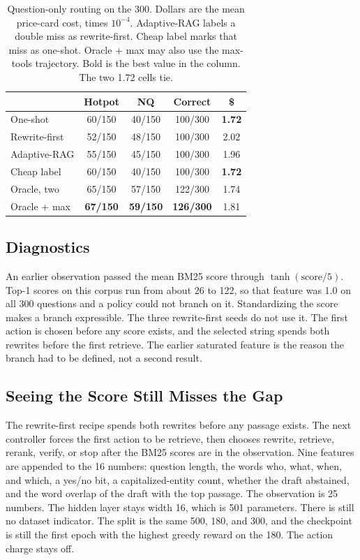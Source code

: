 \documentclass[letterpaper]{article} %
\begin{document}
\begin{table}[t]
\centering
\small
\setlength{\tabcolsep}{3pt}
\begin{tabular}{@{}lcccc@{}}
\toprule
 & Hotpot & NQ & Correct & \$ \\
\midrule
One-shot & 60/150 & 40/150 & 100/300 & \textbf{1.72} \\
Rewrite-first & 52/150 & 48/150 & 100/300 & 2.02 \\
Adaptive-RAG & 55/150 & 45/150 & 100/300 & 1.96 \\
Cheap label & 60/150 & 40/150 & 100/300 & \textbf{1.72} \\
Oracle, two & 65/150 & 57/150 & 122/300 & 1.74 \\
Oracle + max & \textbf{67/150} & \textbf{59/150} & \textbf{126/300} & 1.81 \\
\bottomrule
\end{tabular}
\caption{Question-only routing on the 300. Dollars are the mean price-card cost, times \(10^{-4}\). Adaptive-RAG labels a double miss as rewrite-first. Cheap label marks that miss as one-shot. Oracle + max may also use the max-tools trajectory. Bold is the best value in the column. The two 1.72 cells tie.}
\label{tab:adaptive}
\end{table}

\subsection{Diagnostics}
An earlier observation passed the mean BM25 score through \(\tanh(\mathrm{score}/5)\). Top-1 scores on this corpus run from about 26 to 122, so that feature was 1.0 on all 300 questions and a policy could not branch on it. Standardizing the score makes a branch expressible. The three rewrite-first seeds do not use it. The first action is chosen before any score exists, and the selected string spends both rewrites before the first retrieve. The earlier saturated feature is the reason the branch had to be defined, not a second result.

\subsection{Seeing the Score Still Misses the Gap}
The rewrite-first recipe spends both rewrites before any passage exists. The next controller forces the first action to be retrieve, then chooses rewrite, retrieve, rerank, verify, or stop after the BM25 scores are in the observation. Nine features are appended to the 16 numbers: question length, the words who, what, when, and which, a yes/no bit, a capitalized-entity count, whether the draft abstained, and the word overlap of the draft with the top passage. The observation is 25 numbers. The hidden layer stays width 16, which is 501 parameters. There is still no dataset indicator. The split is the same 500, 180, and 300, and the checkpoint is still the first epoch with the highest greedy reward on the 180. The action charge stays off.
\end{document}
